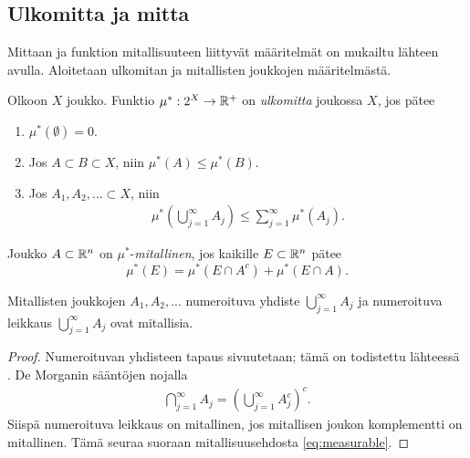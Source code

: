 \documentclass[12pt,oneside,a4paper]{amsbook} %
\begin{document}
\subsection{Ulkomitta ja mitta}
Mittaan ja funktion mitallisuuteen liittyvät määritelmät on mukailtu lähteen \cite[s.88-110]{lehrbäck} avulla. Aloitetaan ulkomitan ja mitallisten joukkojen määritelmästä.
\begin{definition}
    Olkoon $X$ joukko. Funktio $\mu^*: 2^X \to {\mathbb{R}^{+}}$ on \textit{ulkomitta} joukossa $X$, jos pätee
    \begin{enumerate}
        \item $\mu^*(\emptyset) = 0.$
        \item Jos $A \subset B \subset X$, niin $\mu^*(A) \le \mu^*(B)$.
        \item Jos $A_1, A_2, ... \subset X$, niin 
        \begin{align*}
            \mu^*\left(\bigcup_{j=1}^\infty A_j \right) \le \sum_{j = 1}^\infty\mu^*(A_j).
        \end{align*}
    \end{enumerate}
\end{definition}

\begin{definition}
    Joukko $A\subset \mathbb{R}^n$ on $\mu^*$-\textit{mitallinen}, jos kaikille $E\subset \mathbb{R}^n$ pätee
    \begin{equation}\label{eq:measurable}
        \mu^*(E) = \mu^*(E \cap A^c) + \mu^*(E\cap A).
    \end{equation}
\end{definition}

\begin{lemma}\label{le:countableUnionAndIntersectionIsMeas}
    Mitallisten joukkojen $A_1, A_2, ...$ numeroituva yhdiste $\bigcup_{j=1}^\infty A_j$ ja numeroituva leikkaus $\bigcup_{j=1}^\infty A_j$ ovat mitallisia.
\end{lemma}
\begin{proof}
    Numeroituvan yhdisteen tapaus sivuutetaan; tämä on todistettu lähteessä \cite[s. 94]{lehrbäck}.
    De Morganin sääntöjen nojalla
    \begin{align*}
        \bigcap_{j=1}^\infty A_j = \left(\bigcup_{j=1}^\infty A_j^c\right)^c.
    \end{align*}
    Siispä numeroituva leikkaus on mitallinen, jos mitallisen joukon komplementti on mitallinen. Tämä seuraa suoraan mitallisuusehdosta \eqref{eq:measurable}.
\end{proof}
\end{document}
